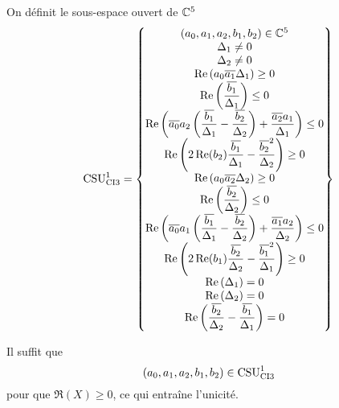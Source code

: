   \begin{defn}
    \label{def:csu:ci3-1}

    On définit le sous-espace ouvert de \(\CC^5\)
    \begin{equation*}
      \CSU[1]{CI3} = \left\lbrace 
      \begin{matrix}
      (a_0,a_1,a_2,b_1,b_2) \in \CC^5
      \\
      \Delta_1 \not = 0
      \\
      \Delta_2 \not = 0
      \\
      \Re\left(a_0\conj{a_1}\Delta_1\right) \ge 0
      \\
      \Re\left(\frac{\conj{b_1}}{\Delta_1}\right) \le 0
      \\
      \Re\left(\conj{a_0}a_2\left(\frac{\conj{b_1}}{\Delta_1}-\frac{\conj{b_2}}{\Delta_2}\right) + \frac{\conj{a_2}a_1}{\Delta_1} \right)\le 0
      \\
      \Re\left(2\Re(b_2)\frac{\conj{b_1}}{\Delta_1}-\frac{\conj{b_2}^2}{\Delta_2}\right) \ge 0
      \\
      \Re\left(a_0\conj{a_2}\Delta_2\right) \ge 0
      \\
      \Re\left(\frac{\conj{b_2}}{\Delta_2}\right) \le 0
      \\
      \Re\left(\conj{a_0}a_1\left(\frac{\conj{b_1}}{\Delta_1}-\frac{\conj{b_2}}{\Delta_2}\right) + \frac{\conj{a_1}a_2}{\Delta_2} \right)\le 0
      \\
      \Re\left(2\Re(b_1)\frac{\conj{b_2}}{\Delta_2}-\frac{\conj{b_1}^2}{\Delta_1}\right) \ge 0
      \\
      \Re\left(\Delta_1\right) = 0
      \\
      \Re\left(\Delta_2\right) = 0
      \\
      \Re\left(\frac{\conj{b_2}}{\Delta_2}-\frac{\conj{b_1}}{\Delta_1}\right) = 0
      \end{matrix}
      \right\rbrace
    \end{equation*}
  \end{defn}
  
 \begin{prop}
    \label{prop:csu:ci3-1}
    Il suffit que
    \begin{equation*}
      (a_0,a_1,a_2,b_1,b_2) \in \CSU[1]{CI3}
    \end{equation*}
    pour que \(\Re(X)\ge 0\), ce qui entraîne l'unicité.
  \end{prop}

